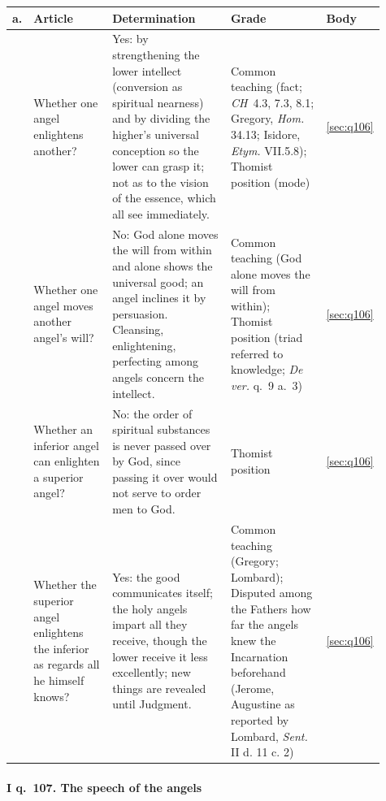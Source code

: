\begingroup\footnotesize
\begin{longtable}{>{\raggedright\arraybackslash}p{0.03\linewidth}>{\raggedright\arraybackslash}p{0.22\linewidth}>{\raggedright\arraybackslash}p{0.33\linewidth}>{\raggedright\arraybackslash}p{0.27\linewidth}>{\raggedright\arraybackslash}p{0.06\linewidth}}
\toprule
\textbf{a.} & \textbf{Article} & \textbf{Determination} & \textbf{Grade} & \textbf{Body}\\
\midrule
\endhead
1 & Whether one angel enlightens another? & Yes: by strengthening the lower intellect (conversion as spiritual nearness) and by dividing the higher's universal conception so the lower can grasp it; not as to the vision of the essence, which all see immediately. & Common teaching (fact; \emph{CH}~4.3, 7.3, 8.1; Gregory, \emph{Hom.} 34.13; Isidore, \emph{Etym.} VII.5.8); Thomist position (mode) & \ref{sec:q106}\\
2 & Whether one angel moves another angel's will? & No: God alone moves the will from within and alone shows the universal good; an angel inclines it by persuasion. Cleansing, enlightening, perfecting among angels concern the intellect. & Common teaching (God alone moves the will from within); Thomist position (triad referred to knowledge; \emph{De ver.} q.~9 a.~3) & \ref{sec:q106}\\
3 & Whether an inferior angel can enlighten a superior angel? & No: the order of spiritual substances is never passed over by God, since passing it over would not serve to order men to God. & Thomist position & \ref{sec:q106}\\
4 & Whether the superior angel enlightens the inferior as regards all he himself knows? & Yes: the good communicates itself; the holy angels impart all they receive, though the lower receive it less excellently; new things are revealed until Judgment. & Common teaching (Gregory; Lombard); Disputed among the Fathers how far the angels knew the Incarnation beforehand (Jerome, Augustine as reported by Lombard, \emph{Sent.} II d. 11 c. 2) & \ref{sec:q106}\\
\bottomrule
\end{longtable}
\endgroup

\paragraph{I q.~107. The speech of the angels}

